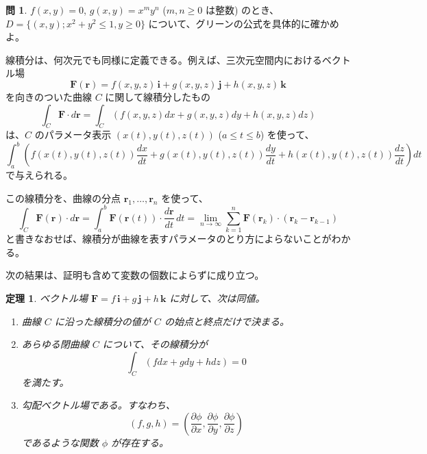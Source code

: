 \documentclass[a4paper]{jsarticle}
\newtheorem{Theorem}{定理}[section]
\theoremstyle{definition}
\newtheorem{Exercise}{問}%
\theoremstyle{remark}
\begin{document}


\begin{Exercise}
$f(x,y) = 0$, $g(x,y) = x^m y^n$ ($m,n \geq 0$ は整数) のとき、$D = \{ (x,y); x^2 + y^2 \leq 1, y \geq 0\}$ について、グリーンの公式を具体的に確かめよ。
\end{Exercise}

線積分は、何次元でも同様に定義できる。例えば、三次元空間内におけるベクトル場
\[
{\bm F}({\bm r}) = f(x,y,z)\,{\bm i} + g(x,y,z)\,{\bm j} + h(x,y,z)\,{\bm k}
\]
を向きのついた曲線 $C$ に関して線積分したもの
\[
\int_C {\bm F} \cdot d{\bm r} = \int_C(f(x,y,z)dx + g(x,y,z)dy + h(x,y,z)dz)
\]
は、$C$ のパラメータ表示 $(x(t),y(t),z(t))$ ($a \leq t \leq b$) を使って、
\[
\int_a^b \left( f(x(t),y(t),z(t)) \frac{dx}{dt} 
+ g(x(t),y(t),z(t)) \frac{dy}{dt} 
+ h(x(t),y(t),z(t)) \frac{dz}{dt} 
\right) dt
\]
で与えられる。

この線積分を、曲線の分点 ${\bm r}_1, \dots, {\bm r}_n$ を使って、
\[
\int_C {\bm F}({\bm r})\cdot d{\bm r} 
= 
\int_a^b {\bm F}({\bm r}(t)) \cdot 
\frac{d{\bm r}}{dt}\, dt = 
\lim_{n \to \infty} \sum_{k=1}^n {\bm F}({\bm r}_k)\cdot ({\bm r}_k - {\bm r}_{k-1}) 
\]
と書きなおせば、線積分が曲線を表すパラメータのとり方によらないことがわかる。

次の結果は、証明も含めて変数の個数によらずに成り立つ。

\begin{Theorem}
ベクトル場 ${\bm F} = f\,{\bm i} + g\,{\bm j} + h\,{\bm k}$ に対して、次は同値。
\begin{enumerate}
\item 
曲線 $C$ に沿った線積分の値が $C$ の始点と終点だけで決まる。
\item 
あらゆる閉曲線 $C$ について、その線積分が
\[
\int_C(fdx + gdy + hdz) = 0
\]
を満たす。
\item 
勾配ベクトル場である。すなわち、
\[
(f,g,h) = \left( 
\frac{\partial \phi}{\partial x},
\frac{\partial \phi}{\partial y}, 
\frac{\partial \phi}{\partial z}
\right)
\]
であるような関数 $\phi$ が存在する。
\end{enumerate}
\end{Theorem}
\end{document}
